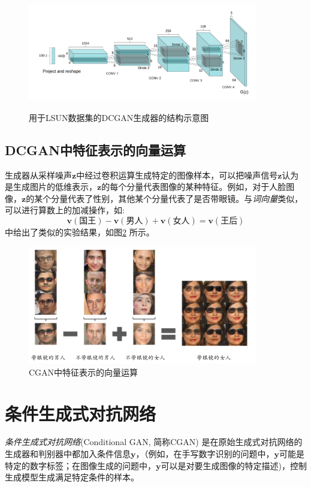 \documentclass[11pt]{ctexart}
\begin{document}
\begin{figure}[htbp]
	\centering
	\includegraphics[width=10cm]{DCGAN}
	\label{fig:dcgan}
	\caption{用于LSUN数据集的DCGAN生成器的结构示意图}
\end{figure}


\subsection{DCGAN中特征表示的向量运算}
生成器从采样噪声$\bm z$中经过卷积运算生成特定的图像样本，可以把噪声信号$\bm z$认为是生成图片的低维表示，$\bm z$的每个分量代表图像的某种特征。例如，对于人脸图像，$\bm z$的某个分量代表了性别，其他某个分量代表了是否带眼镜。与\emph{词向量}类似，可以进行算数上的加减操作，如:
	\[
		\bm v(\text{国王}) - \bm v(\text{男人}) + \bm v(\text{女人}) = \bm v(\text{王后})
	\]
\cite{radford2015unsupervised}中给出了类似的实验结果，如图\ref{fig:dcgan2} 所示。
\begin{figure}[H]
	\centering
	\includegraphics[width=10cm]{dcgan2}
	\caption{CGAN中特征表示的向量运算}
	\label{fig:dcgan2}
\end{figure}


\section{条件生成式对抗网络}
\emph{条件生成式对抗网络}(Conditional GAN, 简称CGAN)
是在原始生成式对抗网络的生成器和判别器中都加入条件信息$\bm y$，（例如，在手写数字识别的问题中，$\bm y$可能是特定的数字标签；在图像生成的问题中，$\bm y$可以是对要生成图像的特定描述)，控制生成模型生成满足特定条件的样本。
\end{document}
